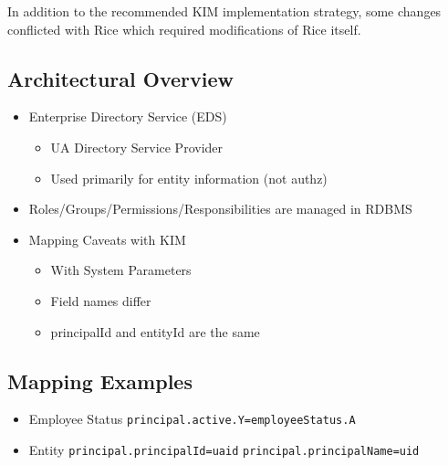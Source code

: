 \documentclass[12pt,notitlepage]{article}
\begin{document}
\begin{s5presentation}
\begin{s5slide}
\begin{s5notes}
      In addition to the recommended KIM implementation strategy, some changes conflicted with Rice 
      which required modifications of Rice itself.
    
      \W \end{s5notes}
    \W \end {s5slide}

  
  \W \begin{s5slide}
    \W \section{Architectural Overview}
    \begin{itemize}
    \item Enterprise Directory Service (EDS)
      \begin{itemize}
      \item UA Directory Service Provider
      \item Used primarily for entity information (not authz)
      \end{itemize}
    \item Roles/Groups/Permissions/Responsibilities are managed in RDBMS
    \item Mapping Caveats with KIM
      \begin{itemize}
      \item With System Parameters
      \item Field names differ
      \item principalId and entityId are the same
      \end{itemize}
    \end{itemize}
    \W \end {s5slide}

  \W \begin{s5slide}
    \W \section{Mapping Examples}
    \begin{itemize}
      \item Employee Status
        \verb|principal.active.Y=employeeStatus.A|
      \item Entity
        \verb|principal.principalId=uaid|
        \verb|principal.principalName=uid|
    \end{itemize}
    \W \end{s5slide}


\end{s5presentation}
\end{document}
